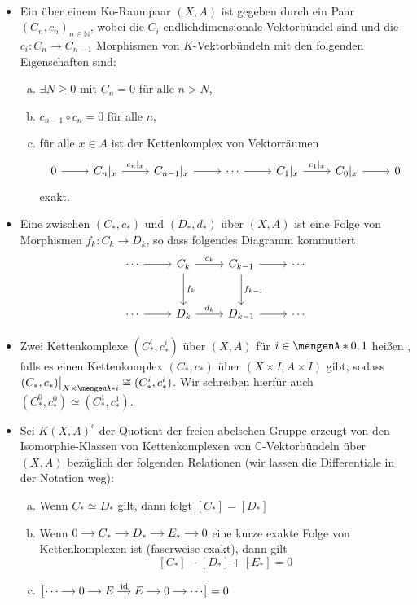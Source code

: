 \begin{definition}
\mbox{ }
\begin{itemize}
	\item Ein  über einem Ko-Raumpaar $(X,A)$ ist gegeben durch ein Paar $(C_n,c_n)_{n \in \mathds{N}}$, wobei die $C_i$ 
	endlichdimensionale Vektorbündel sind und die $c_i \colon C_n \to C_{n-1}$ Morphismen von $K$-Vektorbündeln mit den folgenden Eigenschaften sind:
	\begin{enumerate}[a)]
		\item $\exists N \ge 0$ mit $C_n=0$ für alle $n >N$,
		\item $c_{n-1} \circ c_n =0$ für alle $n$,
		\item für alle $x \in A$ ist der Kettenkomplex von Vektorräumen
		\[
			\begin{tikzcd}
				0 \rar & C_n|_{x} \rar["c_n|_x"] & C_{n-1}|_x \rar & \cdots \rar & C_1|_x \rar["c_1|_x"] & C_0|_x \rar & 0
			\end{tikzcd}
		\]
		exakt.
	\end{enumerate}
	\item Eine  zwischen $(C_*,c_*)$ und $(D_*,d_*)$ über $(X,A)$ ist eine Folge von Morphismen $f_k \colon C_k \to D_k$, so dass folgendes Diagramm 
	kommutiert
	\[
		\begin{tikzcd}[row sep=large]
			\cdots \rar & C_k \rar["c_k"] \dar["f_k"] & C_{k-1} \rar \dar["f_{k-1}"]& \cdots \\
			\cdots \rar & D_k \rar["d_k"] & D_{k-1} \rar & \cdots
		\end{tikzcd}
	\]
	\item Zwei Kettenkomplexe $(C_*^i, c_*^i)$ über $(X,A)$ für $i \in \set{0,1}$ heißen , falls es einen Kettenkomplex $(C_*,c_*)$ über 
	$(X\times I, A \times I)$ gibt, sodass $(C_*,c_*)\big|_{X \times \set{i} } \cong (C_*^i,c_*^i)$. Wir schreiben hierfür auch $(C_*^0,c_*^0) \simeq (C_*^1, c_*^1)$.
	\item Sei $K(X,A)^c$ der Quotient der freien abelschen Gruppe erzeugt von den Isomorphie-Klassen von Kettenkomplexen von $\mathds{C}$-Vektorbündeln über $(X,A)$ 
	bezüglich der folgenden Relationen (wir lassen die Differentiale in der Notation weg):
	\begin{enumerate}[a)]
		\item Wenn $C_* \simeq D_*$ gilt, dann folgt $[C_*] = [D_*]$
		\item Wenn $\begin{tikzcd}[cramped,sep=small]
			0 \rar & C_* \rar & D_* \rar & E_* \rar & 0
		\end{tikzcd}$ eine kurze exakte Folge von Kettenkomplexen ist (faserweise exakt), dann gilt
		\[
			[C_*] - [D_*] + [E_*] = 0
		\]
		\item \(
			\big[ \begin{tikzcd}[cramped,sep=small]
				\cdots \rar & 0 \rar & E \rar["\id"] & E \rar & 0 \rar & \cdots
			\end{tikzcd}\big] =0
		\) 
	\end{enumerate}
\end{itemize}
\end{definition}

